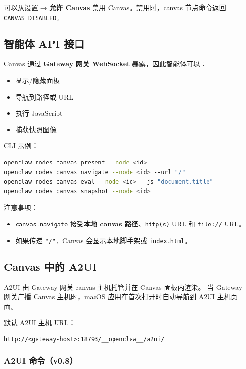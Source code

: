 可以从设置 → \textbf{允许 Canvas} 禁用 Canvas。禁用时，canvas 节点命令返回 \texttt{CANVAS\_DISABLED}。

\subsection{智能体 API 接口}


Canvas 通过 \textbf{Gateway 网关 WebSocket} 暴露，因此智能体可以：

\begin{itemize}
  \item 显示/隐藏面板
  \item 导航到路径或 URL
  \item 执行 JavaScript
  \item 捕获快照图像
\end{itemize}


CLI 示例：

\begin{lstlisting}[language=bash]
openclaw nodes canvas present --node <id>
openclaw nodes canvas navigate --node <id> --url "/"
openclaw nodes canvas eval --node <id> --js "document.title"
openclaw nodes canvas snapshot --node <id>
\end{lstlisting}


注意事项：

\begin{itemize}
  \item \texttt{canvas.navigate} 接受\textbf{本地 canvas 路径}、\texttt{http(s)} URL 和 \texttt{file://} URL。
  \item 如果传递 \texttt{"/"}，Canvas 会显示本地脚手架或 \texttt{index.html}。
\end{itemize}


\subsection{Canvas 中的 A2UI}


A2UI 由 Gateway 网关 canvas 主机托管并在 Canvas 面板内渲染。
当 Gateway 网关广播 Canvas 主机时，macOS 应用在首次打开时自动导航到 A2UI 主机页面。

默认 A2UI 主机 URL：

\begin{lstlisting}
http://<gateway-host>:18793/__openclaw__/a2ui/
\end{lstlisting}


\subsubsection{A2UI 命令（v0.8）}


